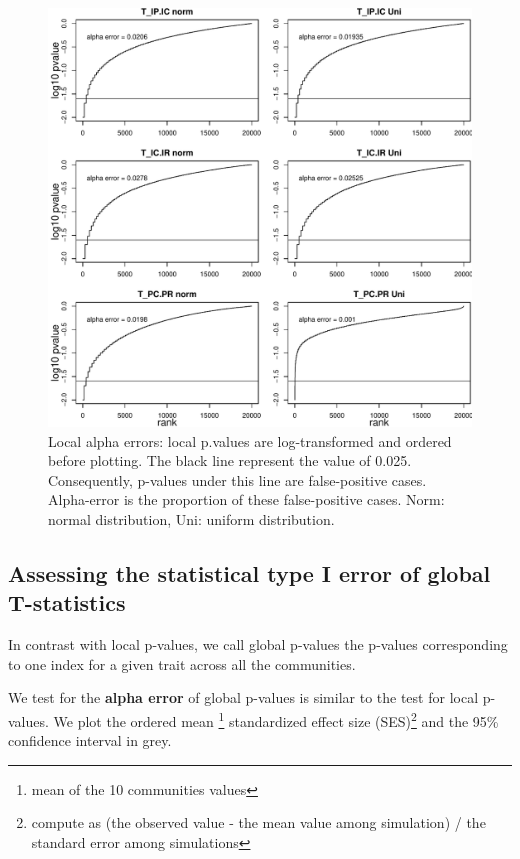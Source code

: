 \documentclass[12pt]{article}\usepackage[]{graphicx}\usepackage[]{color}
\makeatletter
\def\maxwidth{ %
  \ifdim\Gin@nat@width>\linewidth
    \linewidth
  \else
    \Gin@nat@width
  \fi
}
\newenvironment{knitrout}{}{} %
\makeatother
\begin{document}
\begin{knitrout}
\begin{figure}
{\centering \includegraphics[width=\maxwidth]{figure/No_Filter_results-1} 

}

\caption[Local alpha errors]{Local alpha errors: local p.values are log-transformed and ordered before plotting. The black line represent the value of 0.025. Consequently, p-values under this line are false-positive cases. Alpha-error is the proportion of these false-positive cases. Norm: normal distribution, Uni: uniform distribution.}\label{fig:No_Filter_results}
\end{figure}


\end{knitrout}

 \subsection {Assessing the statistical type I error of global T-statistics}

In contrast with local p-values, we call global p-values the p-values corresponding to one index for a given trait across all the communities. 

We test for the \textbf{alpha error} of global p-values is similar to the test for local p-values. We plot the ordered mean \footnote{mean of the 10 communities values} standardized effect size (SES)\footnote{compute as (the observed value - the mean value among simulation) / the standard error among simulations} and the 95\% confidence interval in grey. 
\end{document}
